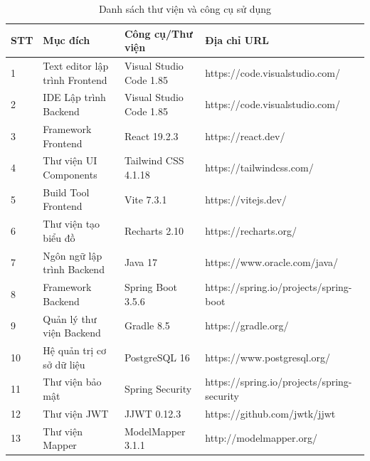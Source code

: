 \documentclass[../20232006p.tex]{subfiles}
\begin{document}
\begin{table}[H]
    \centering
    \caption{Danh sách thư viện và công cụ sử dụng}
    \label{tab:tools_libs}
    \begin{tabular}{|p{0.5cm}|p{3.5cm}|p{3.5cm}|p{6.5cm}|}
        \hline
        \textbf{STT} & \textbf{Mục đích}              & \textbf{Công cụ/Thư viện} & \textbf{Địa chỉ URL}                       \\
        \hline
        1            & Text editor lập trình Frontend & Visual Studio Code 1.85   & https://code.visualstudio.com/             \\
        \hline
        2            & IDE Lập trình Backend          & Visual Studio Code 1.85   & https://code.visualstudio.com/             \\
        \hline
        3            & Framework Frontend             & React 19.2.3              & https://react.dev/                         \\
        \hline
        4            & Thư viện UI Components         & Tailwind CSS 4.1.18       & https://tailwindcss.com/                   \\
        \hline
        5            & Build Tool Frontend            & Vite 7.3.1                & https://vitejs.dev/                        \\
        \hline
        6            & Thư viện tạo biểu đồ           & Recharts 2.10             & https://recharts.org/                      \\
        \hline
        7            & Ngôn ngữ lập trình Backend     & Java 17                   & https://www.oracle.com/java/               \\
        \hline
        8            & Framework Backend              & Spring Boot 3.5.6         & https://spring.io/projects/spring-boot     \\
        \hline
        9            & Quản lý thư viện Backend       & Gradle 8.5                & https://gradle.org/                        \\
        \hline
        10           & Hệ quản trị cơ sở dữ liệu      & PostgreSQL 16             & https://www.postgresql.org/                \\
        \hline
        11           & Thư viện bảo mật               & Spring Security           & https://spring.io/projects/spring-security \\
        \hline
        12           & Thư viện JWT                   & JJWT 0.12.3               & https://github.com/jwtk/jjwt               \\
        \hline
        13           & Thư viện Mapper                & ModelMapper 3.1.1         & http://modelmapper.org/                    \\
        \hline
    \end{tabular}
\end{table}
\end{document}
